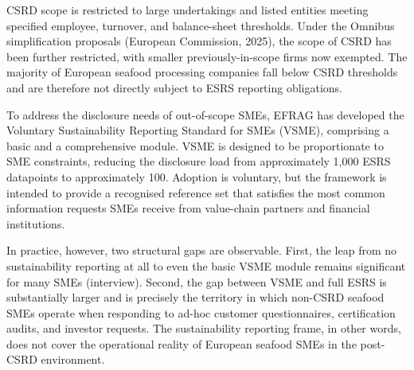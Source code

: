 \documentclass[
]{article}
\begin{document}
CSRD scope is restricted to large undertakings and listed entities
meeting specified employee, turnover, and balance-sheet thresholds.
Under the Omnibus simplification proposals (European Commission, 2025),
the scope of CSRD has been further restricted, with smaller
previously-in-scope firms now exempted. The majority of European seafood
processing companies fall below CSRD thresholds and are therefore not
directly subject to ESRS reporting obligations.

To address the disclosure needs of out-of-scope SMEs, EFRAG has
developed the Voluntary Sustainability Reporting Standard for SMEs
(VSME), comprising a basic and a comprehensive module. VSME is designed
to be proportionate to SME constraints, reducing the disclosure load
from approximately 1,000 ESRS datapoints to approximately 100. Adoption
is voluntary, but the framework is intended to provide a recognised
reference set that satisfies the most common information requests SMEs
receive from value-chain partners and financial institutions.

In practice, however, two structural gaps are observable. First, the
leap from no sustainability reporting at all to even the basic VSME
module remains significant for many SMEs (interview). Second, the gap
between VSME and full ESRS is substantially larger and is precisely the
territory in which non-CSRD seafood SMEs operate when responding to
ad-hoc customer questionnaires, certification audits, and investor
requests. The sustainability reporting frame, in other words, does not
cover the operational reality of European seafood SMEs in the post-CSRD
environment.
\end{document}
